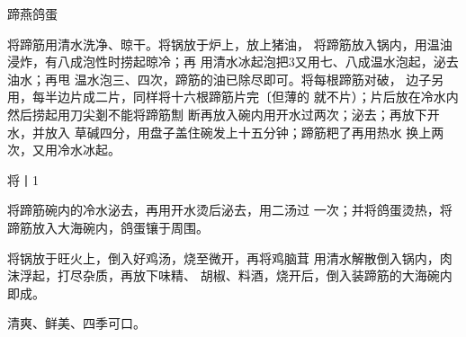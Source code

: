 \begin{recipe}{蹄燕鸽蛋}

\ingredients


\cooking

\step 将蹄筋用清水洗净、晾干。将锅放于炉上，放上猪油， 将蹄筋放入锅内，用温油浸炸，有八成泡性时捞起晾冷；再 用清水冰起泡把3又用七、八成温水泡起，泌去油水；再甩 温水泡三、四次，蹄筋的油已除尽即可。将每根蹄筋对破， 边子另用，每半边片成二片，同样将十六根蹄筋片完〔但薄的 就不片）；片后放在冷水内然后捞起用刀尖剗不能将蹄筋劁 断再放入碗内用开水过两次；泌去；再放下开水，并放入 草碱四分，用盘子盖住碗发上十五分钟；蹄筋粑了再用热水 换上两次，又用冷水冰起。

\step 将丨1%

\step 将蹄筋碗内的冷水泌去，再用开水烫后泌去，用二汤过 一次；并将鸽蛋烫热，将蹄筋放入大海碗内，鸽蛋镶于周围。

\step 将锅放于旺火上，倒入好鸡汤，烧至微开，再将鸡脑茸 用清水解散倒入锅内，肉沫浮起，打尽杂质，再放下味精、 胡椒、料酒，烧开后，倒入装蹄筋的大海碗内即成。

\notes

清爽、鲜美、四季可口。

\end{recipe}

